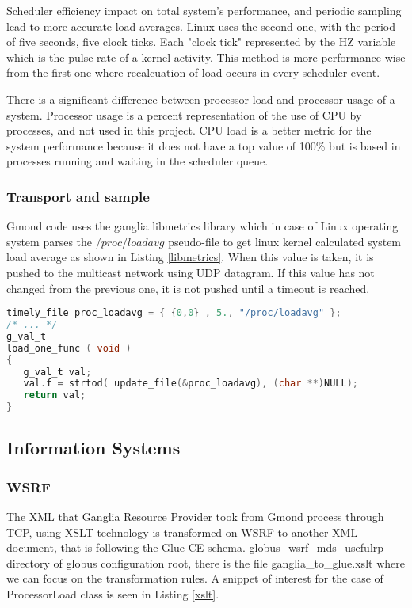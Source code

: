 Scheduler efficiency impact on total system's performance, and periodic sampling lead to more accurate load averages. Linux uses the second one, with the period of five seconds, five clock ticks. Each "clock tick" represented by the HZ variable which is the pulse rate of a kernel activity. This method is more performance-wise from the first one where recalcuation of load occurs in every scheduler event. 

There is a significant difference between processor load and processor usage of a system. Processor usage is a percent representation of the use of CPU by processes, and not used in this project. CPU load is a better metric for the system performance because it does not have a top value of 100\% but is based in processes running and waiting in the scheduler queue.

\subsubsection{Transport and sample}
Gmond code uses the ganglia libmetrics library which in case of Linux operating system parses the $/proc/loadavg$ pseudo-file to get linux kernel calculated system load average as shown in Listing \ref{libmetrics}. When this value is taken, it is pushed to the multicast network using UDP datagram. If this value has not changed from the previous one, it is not pushed until a timeout is reached.

\begin{lstlisting}[language=C,caption=libmetrics code to get load average,label=libmetrics]
timely_file proc_loadavg = { {0,0} , 5., "/proc/loadavg" };
/* ... */
g_val_t
load_one_func ( void )
{
   g_val_t val;
   val.f = strtod( update_file(&proc_loadavg), (char **)NULL);
   return val;
}
\end{lstlisting}

\subsection{Information Systems}

\subsubsection{WSRF}

The XML that Ganglia Resource Provider took from Gmond process through TCP, using XSLT technology is transformed on WSRF to another XML document, that is following the Glue-CE schema. globus\_wsrf\_mds\_usefulrp directory of globus configuration root, there is the file ganglia\_to\_glue.xslt where we can focus on the transformation rules. A snippet of interest for the case of ProcessorLoad class is seen in Listing \ref{xslt}.

